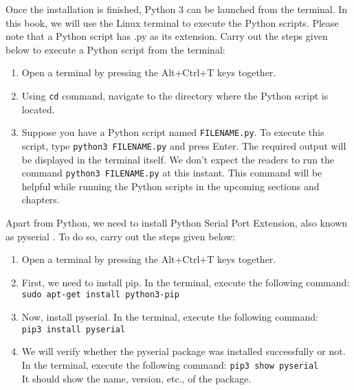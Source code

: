 Once the installation is finished, Python 3 can be launched 
from the terminal. In this book, we will use the Linux terminal to 
execute the Python scripts. Please note that a Python script has .py as its 
extension. Carry out the steps given below to execute a Python script from 
the terminal:
\begin{enumerate}
      \item Open a terminal by pressing the Alt+Ctrl+T keys together.
      \item Using {\tt cd} command, navigate to the directory where the Python script is located. 
      \item Suppose you have a Python script named  {\tt FILENAME.py}. 
      To execute this script, type {\tt python3 FILENAME.py} and press 
      Enter. The required output will be displayed in the terminal itself. 
      We don’t expect the readers to run the command {\tt python3 FILENAME.py} at 
      this instant. This command will be helpful while running the Python 
      scripts in the upcoming sections and chapters. 
\end{enumerate}

Apart from Python, we need to install Python Serial Port Extension, 
also known as pyserial \cite{pySerial}. To do so, carry out the steps given 
below:
\begin{enumerate}
      \item Open a terminal by pressing the Alt+Ctrl+T keys together.
      \item First, we need to install pip. In the terminal, execute the following command: 
      {\tt sudo apt-get install python3-pip} 
      \item Now, install pyserial. In the terminal, execute the following command:\\ 
      {\tt pip3 install pyserial}  
      \item We will verify whether the pyserial package was installed successfully or not. 
      In the terminal, execute the following command: 
      {\tt pip3 show pyserial}\\
      It should show the name, version, etc., of the package. 
\end{enumerate}





